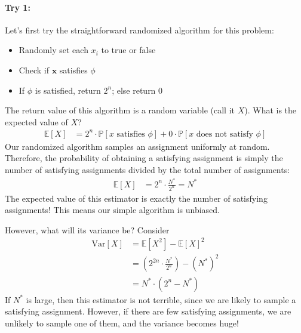 \documentclass[11pt]{article}
\begin{document}
\paragraph*{Try 1:} Let's first try the straightforward randomized algorithm for this problem:
%
\begin{itemize}
    \item Randomly set each $x_i$ to true or false
    \item Check if $\mathbf{x}$ satisfies $\phi$
    \item If $\phi$ is satisfied, return $2^n$; else return $0$
\end{itemize}
%
The return value of this algorithm is a random variable (call it $X$). What is the expected value of $X$?
%
\begin{align}
    \mathbb{E}[X]
        &= 2^n \cdot \mathbb{P}[x\text{ satisfies } \phi] + 0 \cdot \mathbb{P}[x\text{ does not satisfy } \phi]
\end{align}
%
Our randomized algorithm samples an assignment uniformly at random. Therefore, the probability of obtaining a satisfying assignment is simply the number of satisfying assignments divided by the total number of assignments:
%
\begin{align}
    \mathbb{E}[X] &= 2^n \cdot \frac{N^*}{2^n} = N^*
\end{align}
%
The expected value of this estimator is exactly the number of satisfying assignments! This means our simple algorithm is unbiased.

However, what will its variance be? Consider
%
\begin{align}
    \text{Var}[X]
        &= \mathbb{E}[X^2] - \mathbb{E}[X]^2 \\
        &= \left(2^{2n} \cdot \frac{N^*}{2^n}\right) - (N^*)^2 \\
        &= N^* \cdot (2^n - N^*)
\end{align}
%
If $N^*$ is large, then this estimator is not terrible, since we are likely to sample a satisfying assignment. However, if there are few satisfying assignments, we are unlikely to sample one of them, and the variance becomes huge!
\end{document}
